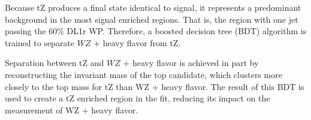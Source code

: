 

Because tZ produces a final state identical to signal, it represents a predominant background in the most signal enriched regions. That is, the region with one jet passing the 60\% DL1r WP. Therefore, a boosted decision tree (BDT) algorithm is trained to separate $WZ$ + heavy flavor from tZ.

Separation between tZ and $WZ$ + heavy flavor is achieved in part by reconstructing the invariant mass of the top candidate, which clusters more closely to the top mass for tZ than WZ + heavy flavor. The result of this BDT is used to create a tZ enriched region in the fit, reducing its impact on the measurement of WZ + heavy flavor.






